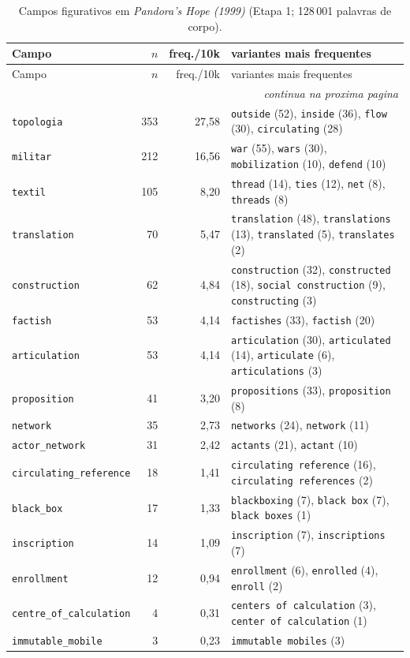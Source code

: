 {\footnotesize
\begin{longtable}{@{}l r r >{\raggedright\arraybackslash}p{6.4cm}@{}}
\caption{Campos figurativos em \emph{Pandora's Hope (1999)} (Etapa 1; 128\,001 palavras de corpo).}\label{tab:campos-pan99}\\
\toprule
Campo & $n$ & freq./10k & variantes mais frequentes \\
\midrule \endfirsthead
\toprule Campo & $n$ & freq./10k & variantes mais frequentes \\ \midrule \endhead
\midrule \multicolumn{4}{r}{\footnotesize \emph{continua na proxima pagina}}\\ \endfoot
\bottomrule \endlastfoot
\texttt{topologia} & 353 & 27{,}58 & \texttt{outside} (52), \texttt{inside} (36), \texttt{flow} (30), \texttt{circulating} (28) \\
\texttt{militar} & 212 & 16{,}56 & \texttt{war} (55), \texttt{wars} (30), \texttt{mobilization} (10), \texttt{defend} (10) \\
\texttt{textil} & 105 & 8{,}20 & \texttt{thread} (14), \texttt{ties} (12), \texttt{net} (8), \texttt{threads} (8) \\
\texttt{translation} & 70 & 5{,}47 & \texttt{translation} (48), \texttt{translations} (13), \texttt{translated} (5), \texttt{translates} (2) \\
\texttt{construction} & 62 & 4{,}84 & \texttt{construction} (32), \texttt{constructed} (18), \texttt{social construction} (9), \texttt{constructing} (3) \\
\texttt{factish} & 53 & 4{,}14 & \texttt{factishes} (33), \texttt{factish} (20) \\
\texttt{articulation} & 53 & 4{,}14 & \texttt{articulation} (30), \texttt{articulated} (14), \texttt{articulate} (6), \texttt{articulations} (3) \\
\texttt{proposition} & 41 & 3{,}20 & \texttt{propositions} (33), \texttt{proposition} (8) \\
\texttt{network} & 35 & 2{,}73 & \texttt{networks} (24), \texttt{network} (11) \\
\texttt{actor\_network} & 31 & 2{,}42 & \texttt{actants} (21), \texttt{actant} (10) \\
\texttt{circulating\_reference} & 18 & 1{,}41 & \texttt{circulating reference} (16), \texttt{circulating references} (2) \\
\texttt{black\_box} & 17 & 1{,}33 & \texttt{blackboxing} (7), \texttt{black box} (7), \texttt{black boxes} (1) \\
\texttt{inscription} & 14 & 1{,}09 & \texttt{inscription} (7), \texttt{inscriptions} (7) \\
\texttt{enrollment} & 12 & 0{,}94 & \texttt{enrollment} (6), \texttt{enrolled} (4), \texttt{enroll} (2) \\
\texttt{centre\_of\_calculation} & 4 & 0{,}31 & \texttt{centers of calculation} (3), \texttt{center of calculation} (1) \\
\texttt{immutable\_mobile} & 3 & 0{,}23 & \texttt{immutable mobiles} (3) \\
\end{longtable}}

